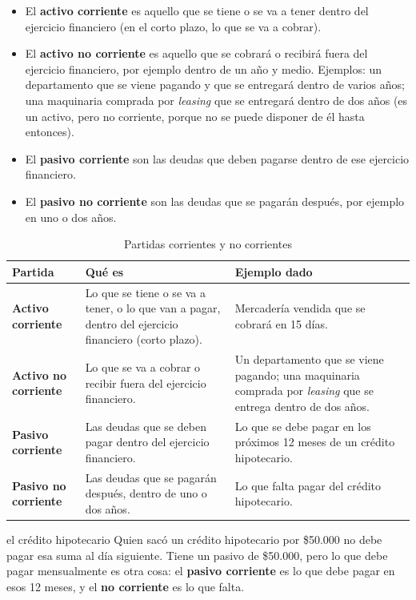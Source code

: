 \documentclass[12pt,oneside]{book}
\begin{document}
\begin{itemize}
    \item El \textbf{activo corriente} es aquello que se tiene o se va a tener dentro del ejercicio financiero (en el corto plazo, lo que se va a cobrar).
    \item El \textbf{activo no corriente} es aquello que se cobrará o recibirá fuera del ejercicio financiero, por ejemplo dentro de un año y medio. Ejemplos: un departamento que se viene pagando y que se entregará dentro de varios años; una maquinaria comprada por \textit{leasing} que se entregará dentro de dos años (es un activo, pero no corriente, porque no se puede disponer de él hasta entonces).
    \item El \textbf{pasivo corriente} son las deudas que deben pagarse dentro de ese ejercicio financiero.
    \item El \textbf{pasivo no corriente} son las deudas que se pagarán después, por ejemplo en uno o dos años.
\end{itemize}

\begin{table}[H]
\centering
\caption{Partidas corrientes y no corrientes}
\begin{tabularx}{\textwidth}{>{\raggedright\arraybackslash}p{} >{\raggedright\arraybackslash}X >{\raggedright\arraybackslash}X}
\toprule
\textbf{Partida} & \textbf{Qué es} & \textbf{Ejemplo dado} \\
\midrule
\textbf{Activo corriente} & Lo que se tiene o se va a tener, o lo que van a pagar, dentro del ejercicio financiero (corto plazo). & Mercadería vendida que se cobrará en 15 días. \\
\textbf{Activo no corriente} & Lo que se va a cobrar o recibir fuera del ejercicio financiero. & Un departamento que se viene pagando; una maquinaria comprada por \textit{leasing} que se entrega dentro de dos años. \\
\textbf{Pasivo corriente} & Las deudas que se deben pagar dentro del ejercicio financiero. & Lo que se debe pagar en los próximos 12 meses de un crédito hipotecario. \\
\textbf{Pasivo no corriente} & Las deudas que se pagarán después, dentro de uno o dos años. & Lo que falta pagar del crédito hipotecario. \\
\bottomrule
\end{tabularx}
\end{table}

\begin{example}{el crédito hipotecario}
Quien sacó un crédito hipotecario por \$50.000 no debe pagar esa suma al día siguiente. Tiene un pasivo de \$50.000, pero lo que debe pagar mensualmente es otra cosa: el \textbf{pasivo corriente} es lo que debe pagar en esos 12 meses, y el \textbf{no corriente} es lo que falta.
\end{example}
\end{document}
